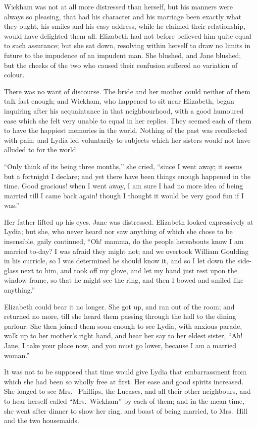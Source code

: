 Wickham was not at all more distressed than herself, but his
manners were always so pleasing, that had his character and his
marriage been exactly what they ought, his smiles and his easy
address, while he claimed their relationship, would have
delighted them all.  Elizabeth had not before believed him
quite equal to such assurance; but she sat down, resolving
within herself to draw no limits in future to the impudence of
an impudent man.  She blushed, and Jane blushed; but the
cheeks of the two who caused their confusion suffered no
variation of colour.

There was no want of discourse.  The bride and her mother could
neither of them talk fast enough; and Wickham, who happened to
sit near Elizabeth, began inquiring after his acquaintance in
that neighbourhood, with a good humoured ease which she felt
very unable to equal in her replies.  They seemed each of them
to have the happiest memories in the world.  Nothing of the
past was recollected with pain; and Lydia led voluntarily to
subjects which her sisters would not have alluded to for the
world.

``Only think of its being three months,'' she cried, ``since I
went away; it seems but a fortnight I declare; and yet there
have been things enough happened in the time.  Good gracious!
when I went away, I am sure I had no more idea of being married
till I came back again! though I thought it would be very good
fun if I was.''

Her father lifted up his eyes.  Jane was distressed.  Elizabeth
looked expressively at Lydia; but she, who never heard nor saw
anything of which she chose to be insensible, gaily continued,
``Oh! mamma, do the people hereabouts know I am married
to-day?  I was afraid they might not; and we overtook William
Goulding in his curricle, so I was determined he should know
it, and so I let down the side-glass next to him, and took off
my glove, and let my hand just rest upon the window frame, so
that he might see the ring, and then I bowed and smiled like
anything.''

Elizabeth could bear it no longer.  She got up, and ran out of
the room; and returned no more, till she heard them passing
through the hall to the dining parlour.  She then joined them
soon enough to see Lydia, with anxious parade, walk up to her
mother's right hand, and hear her say to her eldest sister,
``Ah! Jane, I take your place now, and you must go lower,
because I am a married woman.''

It was not to be supposed that time would give Lydia that
embarrassment from which she had been so wholly free at first.
Her ease and good spirits increased.  She longed to see Mrs.\ %
Phillips, the Lucases, and all their other neighbours, and to
hear herself called ``Mrs.\ Wickham'' by each of them; and in the
mean time, she went after dinner to show her ring, and boast
of being married, to Mrs.\ Hill and the two housemaids.

